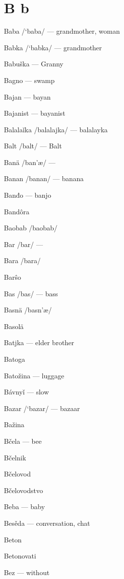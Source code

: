 \chapter{B b}

Baba /`baba/ — grandmother, woman

Babka /`babka/ — grandmother

Babuška  — Granny

Bagno  — swamp

Bajan  — bayan

Bajanist  — bayanist

Balalaǐka /balalajka/ — balalayka

Balt /balt/ — Balt

Banä /ban’æ/ —

Banan /banan/ — banana

Banđo  — banjo

Bandôra 

Baobab /baobab/

Bar /bar/ —

Bara /bara/

Barŝo 

Bas /bas/ — bass

Basnä /basn’æ/

Basolä 

Batjka  — elder brother

Batoga 

Batožina  — luggage

Bávnyǐ  — slow

Bazar /`bazar/ — bazaar

Bažina 

Bčela  — bee

Bčelnik 

Bčelovod 

Bčelovodstvo 

Beba  — baby

Besěda  — conversation, chat

Beton 

Betonovati 

Bez  — without

